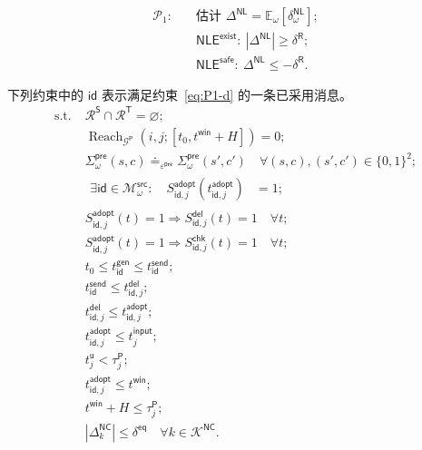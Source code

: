 \documentclass[10pt,a4paper,twocolumn]{article}
\begin{document}
\begin{equation}\label{eq:P1}
\begin{aligned}
\mathcal P_1:\quad
&\text{估计 }\Delta^{\mathsf{NL}}=\mathbb E_\omega[\delta_\omega^{\mathsf{NL}}];\\
&\mathsf{NLE}^{\mathsf{exist}}:\ |\Delta^{\mathsf{NL}}|\geq\delta^{\mathsf R};\\
&\mathsf{NLE}^{\mathsf{safe}}:\ \Delta^{\mathsf{NL}}\leq-\delta^{\mathsf R}.
\end{aligned}
\end{equation}
\addtocounter{equation}{-1}
下列约束中的 $\mathsf{id}$ 表示满足约束~\eqref{eq:P1-d} 的一条已采用消息。
\begin{subequations}
\begin{align}
\mathrm{s.t.}\;&\mathcal R^{\mathsf S}\cap\mathcal R^{\mathsf T}=\varnothing;
\label{eq:P1-a}\\
&\operatorname{Reach}_{\mathcal G^{\mathsf P}}\!(i,j;[t_0,t^{\mathsf{win}}+H])=0;
\label{eq:P1-b}\\
&\Sigma_{\omega}^{\mathsf{pre}}(s,c)\doteq_{\varepsilon^{\mathsf{pre}}}
\Sigma_{\omega}^{\mathsf{pre}}(s',c')
\quad\forall(s,c),(s',c')\in\{0,1\}^{2};
\label{eq:P1-c}\\
&\begin{aligned}
\exists \mathsf{id}\in\mathcal M_{\omega}^{\mathsf{src}}:\quad
S_{\mathsf{id},j}^{\mathsf{adopt}}(t_{\mathsf{id},j}^{\mathsf{adopt}})&=1;
\end{aligned}
\label{eq:P1-d}\\
&S_{\mathsf{id},j}^{\mathsf{adopt}}(t)=1\Rightarrow S_{\mathsf{id},j}^{\mathsf{del}}(t)=1\quad\forall t;
\label{eq:P1-e}\\
&S_{\mathsf{id},j}^{\mathsf{adopt}}(t)=1\Rightarrow S_{\mathsf{id},j}^{\mathsf{chk}}(t)=1\quad\forall t;
\label{eq:P1-f}\\
&t_0\leq t_{\mathsf{id}}^{\mathsf{gen}}\leq t_{\mathsf{id}}^{\mathsf{send}};
\label{eq:P1-g}\\
&t_{\mathsf{id}}^{\mathsf{send}}\leq t_{\mathsf{id},j}^{\mathsf{del}};
\label{eq:P1-h}\\
&t_{\mathsf{id},j}^{\mathsf{del}}\leq t_{\mathsf{id},j}^{\mathsf{adopt}};
\label{eq:P1-i}\\
&t_{\mathsf{id},j}^{\mathsf{adopt}}\leq t_j^{\mathsf{input}};
\label{eq:P1-j}\\
&t_j^{\mathsf u}<\tau_j^{\mathsf P};
\label{eq:P1-k}\\
&t_{\mathsf{id},j}^{\mathsf{adopt}}\leq t^{\mathsf{win}};
\label{eq:P1-l}\\
&t^{\mathsf{win}}+H\leq\tau_j^{\mathsf P};
\label{eq:P1-m}\\
&\left|\Delta_{k}^{\mathsf{NC}}\right|\leq\delta^{\mathsf{eq}}
\quad\forall k\in\mathcal K^{\mathsf{NC}}.
\label{eq:P1-n}
\end{align}
\end{subequations}
\end{document}
